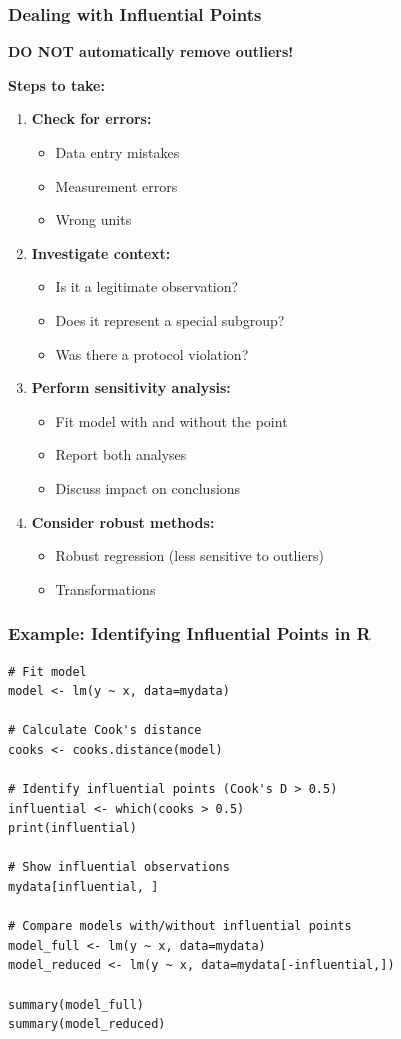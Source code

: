 \documentclass{beamer}
\begin{document}
\begin{frame}
\frametitle{Dealing with Influential Points}
\textbf{DO NOT automatically remove outliers!}

\vspace{0.3cm}
\textbf{Steps to take:}
\begin{enumerate}
\item \textbf{Check for errors:}
  \begin{itemize}
  \item Data entry mistakes
  \item Measurement errors
  \item Wrong units
  \end{itemize}

\item \textbf{Investigate context:}
  \begin{itemize}
  \item Is it a legitimate observation?
  \item Does it represent a special subgroup?
  \item Was there a protocol violation?
  \end{itemize}

\item \textbf{Perform sensitivity analysis:}
  \begin{itemize}
  \item Fit model with and without the point
  \item Report both analyses
  \item Discuss impact on conclusions
  \end{itemize}

\item \textbf{Consider robust methods:}
  \begin{itemize}
  \item Robust regression (less sensitive to outliers)
  \item Transformations
  \end{itemize}
\end{enumerate}
\end{frame}

\begin{frame}[fragile]
\frametitle{Example: Identifying Influential Points in R}
\small
\begin{verbatim}
# Fit model
model <- lm(y ~ x, data=mydata)

# Calculate Cook's distance
cooks <- cooks.distance(model)

# Identify influential points (Cook's D > 0.5)
influential <- which(cooks > 0.5)
print(influential)

# Show influential observations
mydata[influential, ]

# Compare models with/without influential points
model_full <- lm(y ~ x, data=mydata)
model_reduced <- lm(y ~ x, data=mydata[-influential,])

summary(model_full)
summary(model_reduced)
\end{verbatim}
\end{frame}
\end{document}
